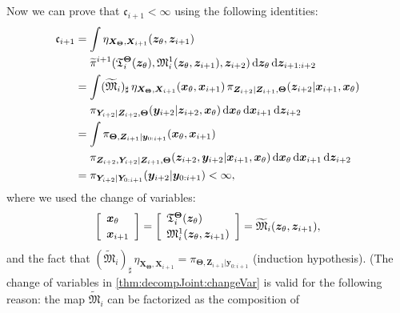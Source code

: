 \documentclass[twoside,11pt]{article}
\newcommand{\push}{_\sharp}                                      %
\newcommand{\Xb}{\boldsymbol{X}}
\newcommand{\xb}{\boldsymbol{x}}
\newcommand{\Yb}{\boldsymbol{Y}}
\newcommand{\yb}{\boldsymbol{y}}
\newcommand{\Zb}{\boldsymbol{Z}}
\newcommand{\zb}{\boldsymbol{z}}
\newcommand{\vhyp}{\boldsymbol{\Theta}}
\newcommand{\vhyps}{\theta}
\newcommand{\submap}{\mathfrak{M}}
\begin{document}
Now we can prove that $\mathfrak{c}_{i+1} < \infty$ using the following identities:
\begin{align} \label{thm:decompJoint:ck}
\mathfrak{c}_{i+1} &= 
  \int 
  \eta_{\Xb_{\vhyp},\Xb_{i+1}}(\zb_{\vhyps},\zb_{i+1})  \\
  &\phantom{{}={}} 
  \widetilde{\pi}^{i+1}(\mathfrak{T}^{\vhyp}_{i}(\zb_{\vhyps}),
  \submap_{i}^1(\zb_{\vhyps},\zb_{i+1}), \zb_{i+2})
  \, {\rm d}\zb_{\vhyps} \, {\rm d}\zb_{i+1:i+2} \nonumber \\ 
  &= 
  \int 
  (\widetilde{\submap}_i)\push\,\eta_{\Xb_{\vhyp},\Xb_{i+1}}(\xb_{\vhyps},\xb_{i+1}) \,
  \pi_{\Zb_{i+2} \vert \Zb_{i+1}, \vhyp}(\zb_{i+2}\vert \xb_{i+1}, \xb_{\vhyps}) 
    \nonumber \\
  &\phantom{{}={}} 
  \pi_{\Yb_{i+2} \vert \Zb_{i+2} , \vhyp }(\yb_{i+2}\vert \zb_{i+2}, \xb_{\vhyps}) 
  \, {\rm d}\xb_{\vhyps} \, {\rm d}\xb_{i+1} \,{\rm d}\zb_{i+2}
    \nonumber \\
  &= 
  \int
  \pi_{ \vhyp, \Zb_{i+1} \vert \yb_{0:i+1}}(\xb_\theta, \xb_{i+1}) \\ \nonumber
  &\phantom{{}={}}  %
  \pi_{\Zb_{i+2},\Yb_{i+2} \vert \Zb_{i+1}, \vhyp}(\zb_{i+2}, \yb_{i+2} \vert \xb_{i+1}, \xb_\theta)
  \, {\rm d}\xb_{\vhyps} \, {\rm d}\xb_{i+1} \,{\rm d}\zb_{i+2}
    \nonumber \\ 
  &=
  \pi_{\Yb_{i+2}\vert \Yb_{0:i+1}}(\yb_{i+2} \vert \yb_{0:i+1}) < \infty,  \nonumber
\end{align}
where we used the change of variables:
%
    \begin{equation}    \label{thm:decompJoint:changeVar}
      \left[\begin{array}{l}
        \xb_{\vhyps}  \\[\spacinglines] 
          \xb_{i+1}
      \end{array}\right]
      = 
      \left[\begin{array}{l}
        \mathfrak{T}^{\vhyp}_{i}(  \zb_{\vhyps} )\\[\spacinglines] 
        \submap^1_i( \zb_{\vhyps} , \zb_{i+1}  )
      \end{array}\right] =
      \widetilde{\submap}_i( \zb_{\vhyps} , \zb_{i+1}  ),
    \end{equation}
and the fact that 
$(\widetilde{\submap}_i) \push\,\eta_{\Xb_{\vhyp},\Xb_{i+1}} = 
\pi_{ \vhyp, \Zb_{i+1} \vert \yb_{0:i+1}}$
(induction hypothesis).
(The change of variables in \eqref{thm:decompJoint:changeVar} is
valid 
%
%
for the following reason:
%
%
the map $\widetilde{\submap}_i$ can be factorized as the composition of
\end{document}
